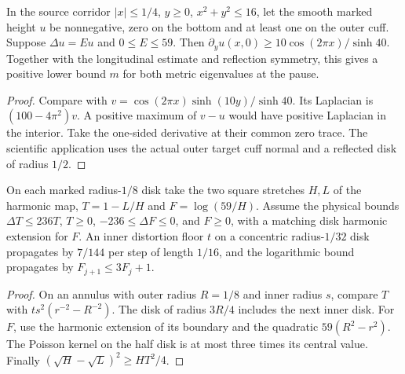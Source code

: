 \begin{proposition}
\label{prop:ed53-corridor}
\leanok
In the source corridor $|x|\le1/4$, $y\ge0$, $x^2+y^2\le16$,
let the smooth marked height $u$ be nonnegative, zero on the bottom
and at least one on the outer cuff. Suppose $\Delta u=Eu$ and
$0\le E\le59$. Then $\partial_yu(x,0)\ge 10\cos(2\pi x)/\sinh40$.
Together with the longitudinal estimate and reflection symmetry, this
gives a positive lower bound $m$ for both metric eigenvalues at the pause.
\end{proposition}
\begin{proof}
\leanok
Compare with $v=\cos(2\pi x)\sinh(10y)/\sinh40$.
Its Laplacian is $(100-4\pi^2)v$. A positive maximum of $v-u$ would
have positive Laplacian in the interior. Take the one-sided derivative
at their common zero trace. The scientific application uses the actual
outer target cuff normal and a reflected disk of radius $1/2$.
\end{proof}

\begin{proposition}
\label{prop:ed53-stretch}
\leanok
On each marked radius-$1/8$ disk take the two square stretches $H,L$
of the harmonic map, $T=1-L/H$ and $F=\log(59/H)$. Assume the
physical bounds $\Delta T\le236T$, $T\ge0$, $-236\le\Delta F\le0$,
and $F\ge0$, with a matching disk harmonic extension for $F$.
An inner distortion floor $t$ on a concentric radius-$1/32$ disk
propagates by $7/144$ per step of length $1/16$, and the logarithmic
bound propagates by $F_{j+1}\le3F_j+1$.
\end{proposition}
\begin{proof}
\leanok
On an annulus with outer radius $R=1/8$ and inner radius $s$, compare
$T$ with $ts^2(r^{-2}-R^{-2})$. The disk of radius $3R/4$ includes
the next inner disk. For $F$, use the harmonic extension of its
boundary and the quadratic $59(R^2-r^2)$. The Poisson kernel on the
half disk is at most three times its central value. Finally
$(\sqrt H-\sqrt L)^2\ge HT^2/4$.
\end{proof}

